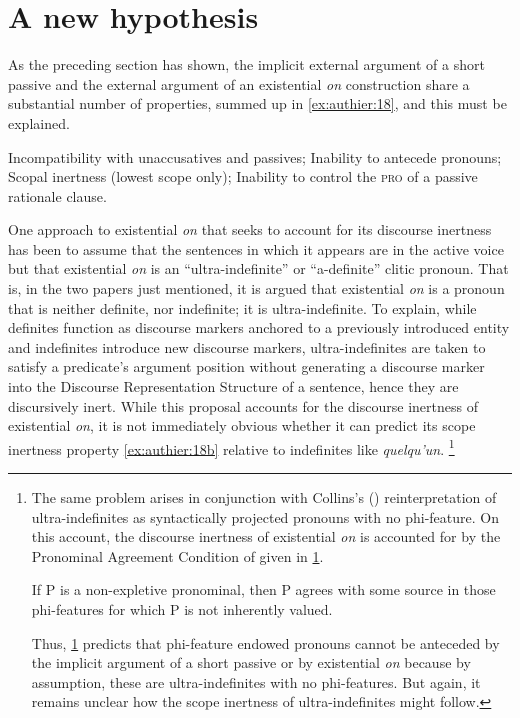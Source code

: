 \documentclass[output=paper,colorlinks,citecolor=brown]{langscibook}
\begin{document}
\section{A new hypothesis}

As the preceding section has shown, the implicit external argument of a short passive and the external argument of an existential \textit{on} construction share a substantial number of properties, summed up in \ref{ex:authier:18}, and this must be explained.


\begin{exe}
\ex\label{ex:authier:18} 
\begin{xlist}
    \ex\label{ex:authier:18a}  Incompatibility with unaccusatives and passives;
    \ex\label{ex:authier:18b}  Inability to antecede pronouns;
    \ex\label{ex:authier:18c}  Scopal inertness (lowest scope only);
    \ex\label{ex:authier:18d}  Inability to control the \textsc{pro} of a passive rationale clause.
\end{xlist}
\end{exe}

One approach to existential \textit{on} that seeks to account for its discourse inertness has been to assume that the sentences in which it appears are in the active voice but that existential \textit{on} is an “ultra-indefinite” \citep{koenig1999a} or “a-definite” \citep{koenig2000a} clitic pronoun. That is, in the two papers just mentioned, it is argued that existential \textit{on} is a pronoun that is neither definite, nor indefinite; it is ultra-indefinite. To explain, while definites function as discourse markers anchored to a previously introduced entity and indefinites introduce new discourse markers, ultra-indefinites are taken to satisfy a predicate’s argument position without generating a discourse marker into the Discourse Representation Structure of a sentence, hence they are discursively inert. While this proposal accounts for the discourse inertness of existential \textit{on}, it is not immediately obvious whether it can predict its scope inertness property \ref{ex:authier:18b} relative to indefinites like \textit{quelqu’un}.
\footnote{The same problem arises in conjunction with Collins’s (\citeyear{collins2017a}) reinterpretation of ultra-indefinites as syntactically projected pronouns with no phi-feature. On this account, the discourse inertness of existential \textit{on} is accounted for by the Pronominal Agreement Condition of \citet[92]{collins2012a} given in \ref{ex:authier:i}.
\begin{exe}
\ex\label{ex:authier:i} If P is a non-expletive pronominal, then P agrees with some source in those phi-features for which P is not inherently valued.
\end{exe}
\par Thus, \ref{ex:authier:i} predicts that phi-feature endowed pronouns cannot be anteceded by the implicit argument of a short passive or by existential \textit{on} because by assumption, these are ultra-indefinites with no phi-features. But again, it remains unclear how the scope inertness of ultra-indefinites might follow. }
\end{document}
